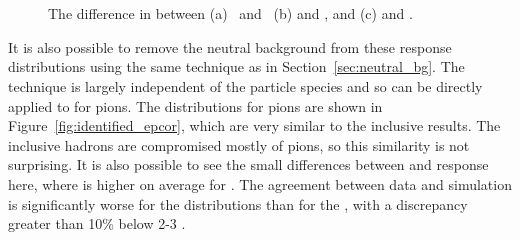 \begin{figure}[htbp]
\centering
{}
\\
~
\caption{ The difference in \epav between (a) \pip\ and \pim\, (b) \pP and \pip, and (c) \pAP and \pim.}
\label{fig:identified_epdiff}
\end{figure}

It is also possible to remove the neutral background from these response distributions using the same technique as in Section~\ref{sec:neutral_bg}. 
The technique is largely independent of the particle species and so can be directly applied to \epav for pions. 
The \epcor distributions for pions are shown in Figure~\ref{fig:identified_epcor}, which are very similar to the inclusive results.
The inclusive hadrons are compromised mostly of pions, so this similarity is not surprising.
It is also possible to see the small differences between \pip and \pim response here, where \epcor is higher on average for \pip.
The agreement between data and simulation is significantly worse for the \pim distributions than for the \pip, with a discrepancy greater than 10\% below 2-3 \GeV. 

